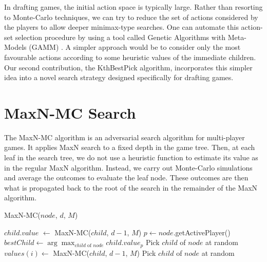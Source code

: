 \documentclass[letterpaper]{article}
\numberwithin{equation}{section}
\numberwithin{theorem}{section}
\numberwithin{lemma}{section}
\numberwithin{df}{section}
\begin{document}

In drafting games, the initial action space is typically large.  Rather than resorting to Monte-Carlo techniques, we can try to reduce the set of actions considered by the players to allow deeper minimax-type searches.  One can automate this action-set selection procedure by using a tool called Genetic Algorithms with Meta-Models (GAMM) \cite{GAMM}.  A simpler approach would be to consider only the most favourable actions according to some heuristic values of the immediate children.  Our second contribution, the KthBestPick algorithm, incorporates this simpler idea into a novel search strategy designed specifically for drafting games.


\section{MaxN-MC Search}


The MaxN-MC algorithm is an adversarial search algorithm for multi-player games.  It applies MaxN search to a fixed depth in the game tree.  Then, at each leaf in the search tree, we do not use a heuristic function to estimate its value as in the regular MaxN algorithm.  Instead, we carry out Monte-Carlo simulations and average the outcomes to evaluate the leaf node.  These outcomes are then what is propagated back to the root of the search in the remainder of the MaxN algorithm.  

\begin{algorithm}[htb]
	\caption{MaxN-MC($node$, $d$, $M$)}
	\label{alg:MaxN-MC}
	\begin{algorithmic}[1]
		\ENDIF
				\STATE $child.value$ $\gets$ MaxN-MC($child$, $d - 1$, $M$)
			\ENDFOR
			\STATE $p \gets node$.getActivePlayer()
			\STATE $bestChild \gets \arg \max_{child \text{ of } node} child.value_p$
				\STATE Pick $child$ of $node$ at random
				\STATE $values(i) \gets $ MaxN-MC($child$, $d-1$, $M$)
			\ENDFOR
		\ELSE
			\STATE Pick $child$ of $node$ at random
		\ENDIF
	\end{algorithmic}
\end{algorithm}
\end{document}

